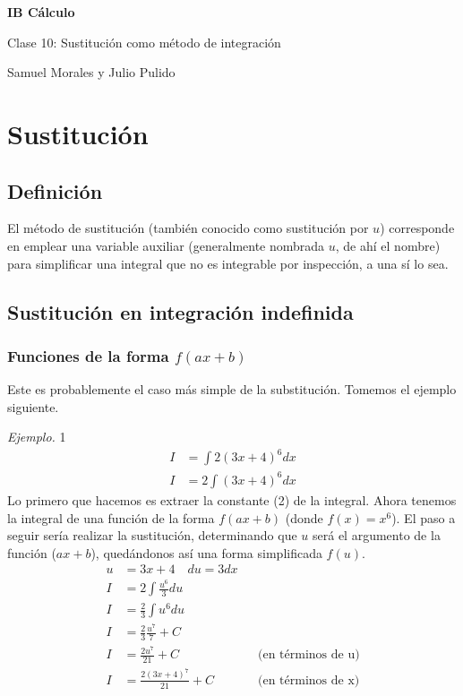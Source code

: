 \documentclass[spanish,12pt]{article}
\begin{document}
	\begin{titlepage}
	\begin{center}
	\hspace{0pt}
	\vfill
	{\Large\textbf{{IB Cálculo}}}
	
	\medskip
	Clase 10: Sustitución como método de integración
	
	\medskip
    Samuel Morales y Julio Pulido
	
	\thispagestyle{empty}
	\vfill
	\end{center}
	\end{titlepage}
\newpage
\tableofcontents
\newpage
\section{Sustitución}
\subsection{Definición}
El método de sustitución (también conocido como sustitución por $u$) corresponde en emplear una variable auxiliar (generalmente nombrada $u$, de ahí el nombre) para simplificar una integral que no es integrable por inspección, a una sí lo sea. 

\subsection{Sustitución en integración indefinida}
\subsubsection{Funciones de la forma $f(ax+b)$}

Este es probablemente el caso más simple de la substitución. Tomemos el ejemplo siguiente.

\textit{Ejemplo.} 1
\begin{align*}
    I&=\int 2(3x+4)^6dx\\
    I&=2\int (3x+4)^6dx
\end{align*}
Lo primero que hacemos es extraer la constante (2) de la integral. Ahora tenemos la integral de una función de la forma $f(ax+b)$ (donde $f(x)=x^6$). El paso a seguir sería realizar la sustitución, determinando que $u$ será el argumento de la función ($ax+b$), quedándonos así una forma simplificada $f(u)$.
\begin{align*}
    u&=3x+4 \quad du=3dx\\
    I&=2\int \frac{u^6}{3}du\\
    I&=\frac{2}{3}\int u^6du\\
    I&=\frac{2}{3}\frac{u^7}{7}+C\\
    I&=\frac{2u^7}{21}+C && \text{(en términos de u)}\\
    I&=\frac{2(3x+4)^7}{21}+C && \text{(en términos de x)}
\end{align*}
\end{document}
